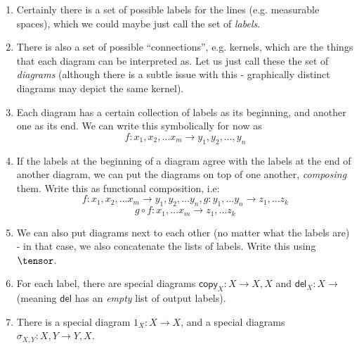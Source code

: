 \documentclass{article}
\newcommand{\del}{\mathsf{del}}
\newcommand{\cop}{\mathsf{copy}}
\begin{document}
\begin{enumerate}
    \item Certainly there is a set of possible labels for the lines (e.g. measurable spaces)\footnotemark, which we could maybe just call the set of \emph{labels}.
    \item There is also a set of possible ``connections'', e.g. kernels, which are the things that each diagram can be interpreted as. Let us just call these the set of \emph{diagrams} (although there is a subtle issue with this - graphically distinct diagrams may depict the same kernel).
    \item Each diagram has a certain collection of labels as its beginning, and another one as its end. We can write this symbolically for now as
    \[f: x_1, x_2, \dots x_m \to y_1, y_2, \dots, y_n\]
    \item If the labels at the beginning of a diagram agree with the labels at the end of another diagram, we can put the diagrams on top of one another, \emph{composing} them.
    Write this as functional composition, i.e:
    \[f: x_1, x_2, \dots x_m \to y_1, y_2, \dots y_n, g:y_1, \dots y_n \to z_1, \dots z_k\]
    \[g\circ f : x_1, \dots x_m \to z_1, \dots z_k\]
    \item We can also put diagrams next to each other (no matter what the labels are) - in that case, we also concatenate the lists of labels. Write this using $\tensor$.
    \item For each label, there are special diagrams $\cop_X: X \to X,X$ and $\del_X: X \to$ (meaning $\del$ has an \emph{empty} list of output labels).
    \item There is a special diagram $1_X : X \to X$, and a special diagrams $\sigma_{X,Y}: X,Y \to Y,X$.
\end{enumerate}
\end{document}
